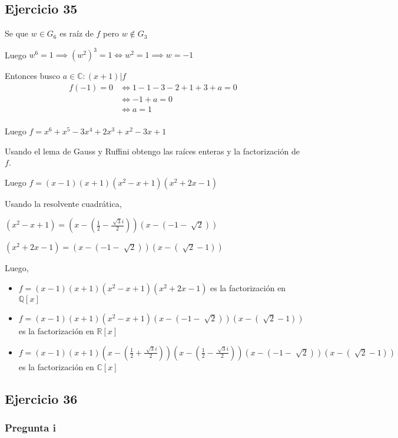 \subsection{Ejercicio 35}

Se que $ w \in G_6 $ es raíz de $f$ pero $ w \not \in G_3 $

Luego $ w^6 = 1 \implies (w^2)^3 = 1 \iff w^2 = 1 \implies w=-1 $

Entonces busco $ a \in \mathbb{C}: (x+1)|f $
\begin{align*}
    f(-1) = 0 &\iff 1 - 1 -3 -2 +1 +3 +a =0 \\ 
    &\iff -1 + a =0 \\ 
    &\iff a = 1 \\ 
\end{align*}

Luego $ f = x^6 + x^5 - 3x^4 + 2x^3 + x^2 -3x + 1 $

Usando el lema de Gauss y Ruffini obtengo las raíces enteras y la factorización de $f$.

Luego $ f = (x - 1) (x + 1) (x^2 - x + 1) (x^2 + 2 x - 1) $

Usando la resolvente cuadrática,

$ (x^2 - x + 1) = (x-(\frac{1}{2} - \frac{\sqrt[]{3}i}{2}))(x-(-1-\sqrt[]{2})) $

$ (x^2 + 2 x - 1) = (x-(-1-\sqrt[]{2}))(x-(\sqrt[]{2} - 1)) $

Luego,
\begin{itemize}
    \item $ f = (x - 1) (x + 1) (x^2 - x + 1) (x^2 + 2 x - 1) $ es la factorización en $ \mathbb{Q}[x] $
    \item $ f = (x - 1) (x + 1) (x^2 - x + 1) (x-(-1-\sqrt[]{2}))(x-(\sqrt[]{2} - 1)) $ es la factorización en $ \mathbb{R}[x] $
    \item $ f = (x - 1) (x + 1)(x-(\frac{1}{2} + \frac{\sqrt[]{3}i}{2}))(x-(\frac{1}{2} - \frac{\sqrt[]{3}i}{2}))(x-(-1-\sqrt[]{2}))(x-(\sqrt[]{2} - 1)) $ es la factorización en $ \mathbb{C}[x] $
\end{itemize}

\subsection{Ejercicio 36}

\subsubsection{Pregunta i}

